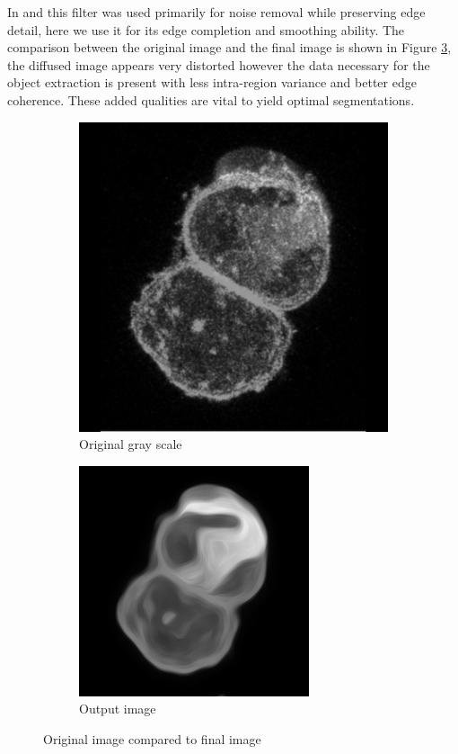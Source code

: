\documentclass[a4paper,11pt]{ijamas}
\begin{document}
In \cite{mmaska:2013} and \cite{dkroon:2009} this filter was used primarily for noise removal while preserving edge detail, here we use it for its edge completion and smoothing ability.
The comparison between the original image and the final image is shown in Figure  \ref{Org_dif}, the diffused image appears very distorted however the data necessary for the object extraction is present with less intra-region variance and better edge coherence. These added qualities are vital to yield optimal segmentations.


\begin{figure}[!h]
\centering
\begin{subfigure}{.48\textwidth}
  \centering
  \includegraphics[width=0.80\columnwidth]{./figs/_2gray.jpg}
 \caption{Original gray scale}
  \label{fig:test_original}
\end{subfigure}%
\begin{subfigure}{.48\textwidth}
  \centering
  \includegraphics[width=0.80\columnwidth]{./figs/2diffused.jpg}
 \caption{Output image}
  \label{fig:diffused_1}
\end{subfigure}%
\caption{Original image compared to final image}\label{Org_dif}
\end{figure}
\end{document}
